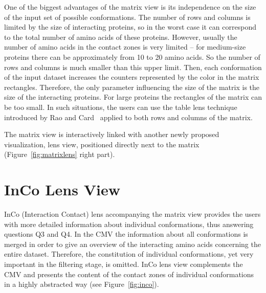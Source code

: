 \documentclass[journal]{vgtc}                %
\begin{document}
One of the biggest advantages of the matrix view is its independence on the size of the input set of possible conformations.
The number of rows and columns is limited by the size of interacting proteins, so in the worst case it can correspond to the total number of amino acids of these proteins.
However, usually the number of amino acids in the contact zones is very limited -- for medium-size proteins there can be approximately from 10 to 20 amino acids.
So the number of rows and columns is much smaller than this upper limit.
Then, each conformation of the input dataset increases the counters represented by the color in the matrix rectangles.
Therefore, the only parameter influencing the size of the matrix is the size of the interacting proteins.
For large proteins the rectangles of the matrix can be too small.
In such situations, the users can use the table lens technique introduced by Rao and Card~\cite{Rao1994} applied to both rows and columns of the matrix.

The matrix view is interactively linked with another newly proposed visualization, lens view, positioned directly next to the matrix (Figure~\ref{fig:matrixlens} right part). 

\section{InCo Lens View}
InCo (Interaction Contact) lens accompanying the matrix view provides the users with more detailed information about individual conformations, thus answering questions Q3 and Q4.
In the CMV the information about all conformations is merged in order to give an overview of the interacting amino acids concerning the entire dataset.
Therefore, the constitution of individual conformations, yet very important in the filtering stage, is omitted.
InCo lens view complements the CMV and presents the content of the contact zones of individual conformations in a highly abstracted way (see Figure~\ref{fig:inco}).
\end{document}
